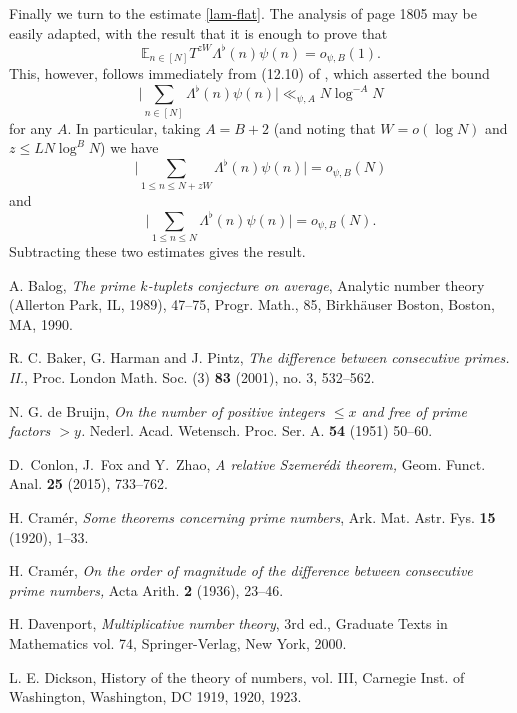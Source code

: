 \documentclass[11pt]{amsart}
\numberwithin{equation}{section}  %
\theoremstyle{remark}
\theoremstyle{plain}
\numberwithin{equation}{section}
\newcommand{\E}{\mathbb{E}}  %
\renewcommand{\le}{\leqslant}
\renewcommand{\leq}{\leqslant}
\renewcommand{\(}{\left(}
\renewcommand{\)}{\right)}
\begin{document}
Finally we turn to the estimate \eqref{lam-flat}. The analysis of page 1805 may be easily adapted, with the result that it is enough to prove that 
\[ \E_{n \in [N]} T^{zW} \Lambda^{\flat}(n) \psi(n) = o_{\psi, B}(1).\]
This, however, follows immediately from (12.10) of \cite{gt-linearprimes}, which asserted the bound
\[ \bigg|\sum_{n \in [N]} \Lambda^{\flat}(n) \psi(n)\bigg| \ll_{\psi, A} N \log^{-A} N\] for any $A$. In particular, taking $A = B + 2$ (and noting that $W = o(\log N)$ and $z \leq LN\log^B N$) we have
\[ \bigg|\sum_{1 \leq n \leq N + zW} \Lambda^{\flat}(n) \psi(n)\bigg| = o_{\psi,B}(N)\]
and
\[ \bigg|\sum_{1 \leq n \leq N} \Lambda^{\flat}(n)\psi(n)\bigg| = o_{\psi, B}(N).\]
Subtracting these two estimates gives the result.

%


\begin{thebibliography}{999}

A.  Balog, \emph{The prime $k$-tuplets conjecture on average}, Analytic number theory (Allerton Park, IL, 1989), 47–75, Progr. Math., 85, Birkh\"auser Boston, Boston, MA, 1990.

 R. C. Baker, G. Harman and J. Pintz,
{\it The difference between consecutive primes. II.},
Proc. London Math. Soc. (3) {\bf 83} (2001), no. 3, 532--562.

 N. G. de Bruijn, \emph{On the number of positive 
integers $\le x$ and free of prime factors $>y$.}
Nederl. Acad. Wetensch. Proc. Ser. A. \textbf{54} (1951) 50--60. 


 D.~Conlon, J.~Fox and Y.~Zhao, \emph{A relative Szemer\'edi theorem,} Geom. Funct. Anal. \textbf{25} (2015), 733--762.

  H. Cram\'er,  \emph{Some theorems concerning prime numbers},
Ark. Mat. Astr. Fys. {\bf 15} (1920), 1--33.

 H. Cram\'er, \emph{On the order of magnitude of the difference
between consecutive prime numbers,} Acta Arith. \textbf{2} (1936),
23--46.

 H. Davenport, {\it Multiplicative number theory}, 3rd ed.,
Graduate Texts in Mathematics vol. 74, Springer-Verlag, New York, 2000.

 L. E. Dickson, History of the theory of numbers, vol. III, Carnegie Inst. of Washington,
Washington, DC 1919, 1920, 1923.


\end{thebibliography}
\end{document}
